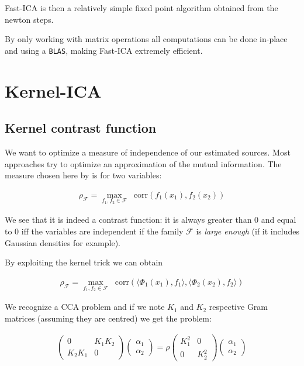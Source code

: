 \documentclass[a4paper,BCOR=5mm,oneside,openany]{scrreprt}
\newcommand*\corr{\mathop{}\!\mathrm{corr}}
\begin{document}
Fast-ICA is then a relatively simple fixed point algorithm obtained from the newton steps.

By only working with matrix operations all computations can be done in-place and using a \texttt{BLAS}, making Fast-ICA extremely efficient.

\chapter{Kernel-ICA}

\section{Kernel contrast function}

We want to optimize a measure of independence of our estimated sources. Most approaches try to optimize an approximation of the mutual information. The measure chosen here by \cite{Bach2002} is for two variables:

\begin{align*}
	\rho_\mathcal{F} = \max_{f_1, f_2 \in \mathcal{F}} \corr (f_1(x_1), f_2 (x_2))
\end{align*}

We see that it is indeed a contrast function: it is always greater than $0$ and equal to $0$ iff the variables are independent if the family $\mathcal{F}$ is \emph{large enough} (if it includes Gaussian densities for example).

By exploiting the kernel trick we can obtain

\begin{align*}
	\rho_\mathcal{F} = \max_{f_1, f_2 \in \mathcal{F}} \corr ( \langle \Phi_1 (x_1), f_1 \rangle , \langle \Phi_2 (x_2), f_2 \rangle)
\end{align*}

We recognize a CCA problem and if we note $K_1$ and $K_2$ respective Gram matrices (assuming they are centred) we get the problem:

\begin{align*}
	\begin{pmatrix}
		0 & K_1 K_2 \\
		K_2 K_1 & 0
	\end{pmatrix} \begin{pmatrix}
		\alpha_1 \\ \alpha_2
	\end{pmatrix}
	= \rho \begin{pmatrix}
		K_1^2 & 0 \\
		0 & K_2^2
	\end{pmatrix} \begin{pmatrix}
		\alpha_1 \\ \alpha_2
	\end{pmatrix}
\end{align*}
\end{document}
